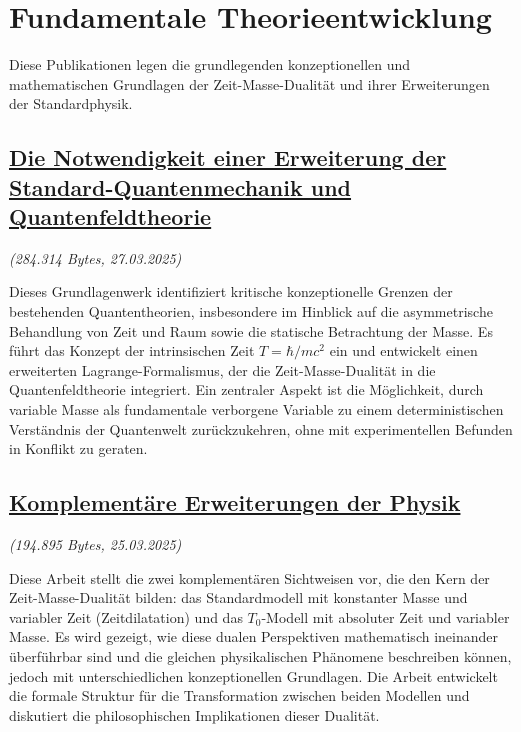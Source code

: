 \documentclass[a4paper,12pt]{article}
\newcommand{\repobase}{https://github.com/jpascher/T0-Time-Mass-Duality/tree/main/2/}
\begin{document}
	\section{Fundamentale Theorieentwicklung}
	
	Diese Publikationen legen die grundlegenden konzeptionellen und mathematischen Grundlagen der Zeit-Masse-Dualität und ihrer Erweiterungen der Standardphysik.
	
	\subsection{\href{\repobase/pdf/Deutsch/Die Notwendigkeit einer Erweiterung der Standard-Quantenmechanik und Quantenfeldtheorie.pdf}{Die Notwendigkeit einer Erweiterung der Standard-Quantenmechanik und Quantenfeldtheorie}}
	\textit{(284.314 Bytes, 27.03.2025)}
	
	Dieses Grundlagenwerk identifiziert kritische konzeptionelle Grenzen der bestehenden Quantentheorien, insbesondere im Hinblick auf die asymmetrische Behandlung von Zeit und Raum sowie die statische Betrachtung der Masse. Es führt das Konzept der intrinsischen Zeit $T = \hbar/mc^2$ ein und entwickelt einen erweiterten Lagrange-Formalismus, der die Zeit-Masse-Dualität in die Quantenfeldtheorie integriert. Ein zentraler Aspekt ist die Möglichkeit, durch variable Masse als fundamentale verborgene Variable zu einem deterministischen Verständnis der Quantenwelt zurückzukehren, ohne mit experimentellen Befunden in Konflikt zu geraten.
	
	\subsection{\href{\repobase/pdf/Deutsch/Komplementäre Erweiterungen der Physik.pdf}{Komplementäre Erweiterungen der Physik}}
	\textit{(194.895 Bytes, 25.03.2025)}
	
	Diese Arbeit stellt die zwei komplementären Sichtweisen vor, die den Kern der Zeit-Masse-Dualität bilden: das Standardmodell mit konstanter Masse und variabler Zeit (Zeitdilatation) und das $T_0$-Modell mit absoluter Zeit und variabler Masse. Es wird gezeigt, wie diese dualen Perspektiven mathematisch ineinander überführbar sind und die gleichen physikalischen Phänomene beschreiben können, jedoch mit unterschiedlichen konzeptionellen Grundlagen. Die Arbeit entwickelt die formale Struktur für die Transformation zwischen beiden Modellen und diskutiert die philosophischen Implikationen dieser Dualität.
	
\end{document}
